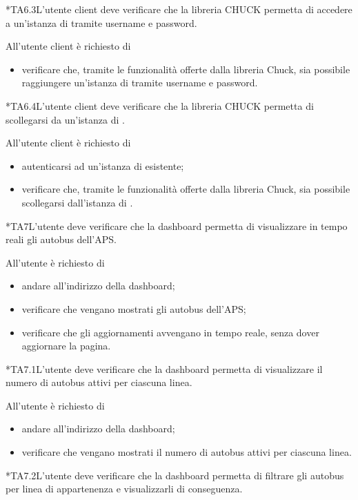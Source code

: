 	*{TA6.3}L'utente client deve verificare che la libreria CHUCK permetta di accedere a un'istanza di \projectname{} tramite username e password.
		
		All'utente client è richiesto di
		\begin{itemize}
			\item verificare che, tramite le funzionalità offerte dalla libreria Chuck, sia possibile raggiungere un'istanza di \projectname{} tramite username e password.
		\end{itemize}

	*{TA6.4}L'utente client deve verificare che la libreria CHUCK permetta di scollegarsi da un'istanza di \projectname{}.

		All'utente client è richiesto di
		\begin{itemize}
			\item autenticarsi ad un'istanza di \projectname{} esistente;
			\item verificare che, tramite le funzionalità offerte dalla libreria Chuck, sia possibile scollegarsi dall'istanza di \projectname{}.
		\end{itemize}

	*{TA7}L'utente deve verificare che la dashboard permetta di visualizzare in tempo reali gli autobus dell'APS.

		All'utente è richiesto di
		\begin{itemize}
			\item andare all'indirizzo della dashboard;
			\item verificare che vengano mostrati gli autobus dell'APS;
			\item verificare che gli aggiornamenti avvengano in tempo reale, senza dover aggiornare la pagina.
		\end{itemize}

	*{TA7.1}L'utente deve verificare che la dashboard permetta di visualizzare il numero di autobus attivi per ciascuna linea.

		All'utente è richiesto di
		\begin{itemize}
			\item andare all'indirizzo della dashboard;
			\item verificare che vengano mostrati il numero di autobus attivi per ciascuna linea.
		\end{itemize}

	*{TA7.2}L'utente deve verificare che la dashboard permetta di filtrare gli autobus per linea di appartenenza e visualizzarli di conseguenza.

